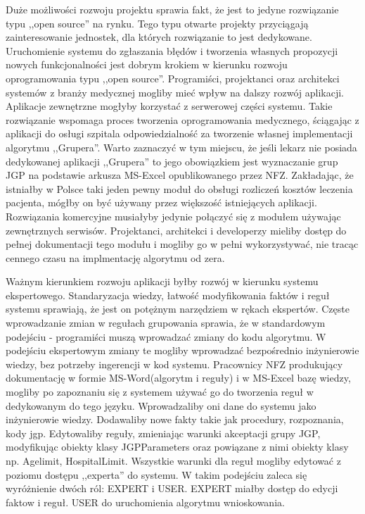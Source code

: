 Duże możliwości rozwoju projektu sprawia fakt, że jest to jedyne rozwiązanie typu ,,open source'' na rynku. Tego typu otwarte projekty przyciągają zainteresowanie jednostek, dla których rozwiązanie to jest dedykowane. Uruchomienie systemu do zgłaszania błędów i tworzenia własnych propozycji nowych funkcjonalności jest dobrym krokiem w kierunku rozwoju oprogramowania typu ,,open source''. Programiści, projektanci oraz architekci systemów z branży medycznej mogliby mieć wpływ na dalszy rozwój aplikacji.
Aplikacje zewnętrzne mogłyby korzystać z serwerowej części systemu. Takie rozwiązanie wspomaga proces tworzenia oprogramowania medycznego, ściągając z aplikacji do osługi szpitala odpowiedzialność za tworzenie własnej implementacji algorytmu ,,Grupera''. Warto zaznaczyć w tym miejscu, że jeśli lekarz nie posiada dedykowanej aplikacji ,,Grupera'' to jego obowiązkiem jest wyznaczanie grup JGP na podstawie arkusza MS-Excel opublikowanego przez NFZ\cite{plik_parametryzujacy}. 
Zakładając, że istniałby w Polsce taki jeden pewny moduł do obsługi rozliczeń kosztów leczenia pacjenta, mógłby on być używany przez większość istniejących aplikacji. Rozwiązania komercyjne musiałyby jedynie połączyć się z modułem używając zewnętrznych serwisów. Projektanci, architekci i developerzy mieliby dostęp do pełnej dokumentacji tego modułu i mogliby go w pełni wykorzystywać, nie tracąc cennego czasu na implmentację algorytmu od zera.

Ważnym kierunkiem rozwoju aplikacji byłby rozwój w kierunku systemu ekspertowego. Standaryzacja wiedzy, łatwość modyfikowania faktów i reguł systemu sprawiają, że jest on potężnym narzędziem w rękach ekspertów. Częste wprowadzanie zmian w regułach grupowania sprawia, że w standardowym podejściu - programiści muszą wprowadzać zmiany do kodu algorytmu. W podejściu ekspertowym zmiany te mogliby wprowadzać bezpośrednio inżynierowie wiedzy, bez potrzeby ingerencji w kod systemu. Pracownicy NFZ produkujący dokumentację w formie MS-Word(algorytm i reguły) i w MS-Excel bazę wiedzy, mogliby po zapoznaniu się z systemem używać go do tworzenia reguł w dedykowanym do tego języku. Wprowadzaliby oni dane do systemu jako inżynierowie wiedzy. Dodawaliby nowe fakty takie jak procedury, rozpoznania, kody jgp. Edytowaliby reguły, zmieniając warunki akceptacji grupy JGP, modyfikując obiekty klasy JGPParameters oraz powiązane z nimi obiekty klasy np. Agelimit, HospitalLimit. Wszystkie warunki dla reguł mogliby edytować z poziomu dostępu ,,experta'' do systemu.
W takim podejściu zaleca się wyróżnienie dwóch ról: EXPERT i USER. EXPERT miałby dostęp do edycji faktow i reguł. USER do uruchomienia algorytmu wnioskowania.

